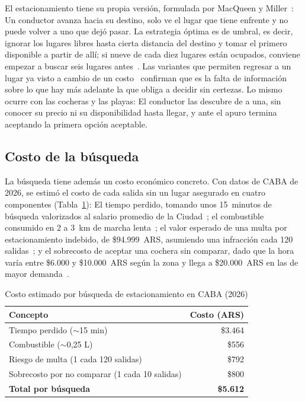 \documentclass[conference,a4paper]{IEEEtran}
\begin{document}
El estacionamiento tiene su propia versión, formulada por MacQueen y Miller~\cite{macqueen1960}: Un conductor avanza hacia su destino, solo ve el lugar que tiene enfrente y no puede volver a uno que dejó pasar. La estrategia óptima es de umbral, es decir, ignorar los lugares libres hasta cierta distancia del destino y tomar el primero disponible a partir de allí; si nueve de cada diez lugares están ocupados, conviene empezar a buscar seis lugares antes~\cite{fergusonstopping}. Las variantes que permiten regresar a un lugar ya visto a cambio de un costo~\cite{tamaki1988} confirman que es la falta de información sobre lo que hay más adelante la que obliga a decidir sin certezas. Lo mismo ocurre con las cocheras y las playas: El conductor las descubre de a una, sin conocer su precio ni su disponibilidad hasta llegar, y ante el apuro termina aceptando la primera opción aceptable.

\subsection{Costo de la búsqueda}

La búsqueda tiene además un costo económico concreto. Con datos de CABA de 2026, se estimó el costo de cada salida sin un lugar asegurado en cuatro componentes (Tabla~\ref{tab:costo}): El tiempo perdido, tomando unos 15~minutos de búsqueda valorizados al salario promedio de la Ciudad~\cite{infobae_salarios_2026}; el combustible consumido en 2 a 3~km de marcha lenta~\cite{economista_nafta_2026}; el valor esperado de una multa por estacionamiento indebido, de \$94.999~ARS, asumiendo una infracción cada 120 salidas~\cite{infobae_multas_2026}; y el sobrecosto de aceptar una cochera sin comparar, dado que la hora varía entre \$6.000 y \$10.000~ARS según la zona y llega a \$20.000~ARS en las de mayor demanda~\cite{iprofesional2026cocheras}.

\begin{table}[!t]
\centering
\caption{Costo estimado por búsqueda de estacionamiento en CABA (2026)}
\label{tab:costo}
\renewcommand{\arraystretch}{1.2}
\begin{tabular}{l r}
\toprule
\textbf{Concepto} & \textbf{Costo (ARS)} \\
\midrule
Tiempo perdido (${\sim}$15 min) & \$3.464 \\
Combustible (${\sim}$0,25 L) & \$556 \\
Riesgo de multa (1 cada 120 salidas) & \$792 \\
Sobrecosto por no comparar (1 cada 10 salidas) & \$800 \\
\midrule
\textbf{Total por búsqueda} & \textbf{\$5.612} \\
\bottomrule
\end{tabular}
\end{table}
\end{document}
